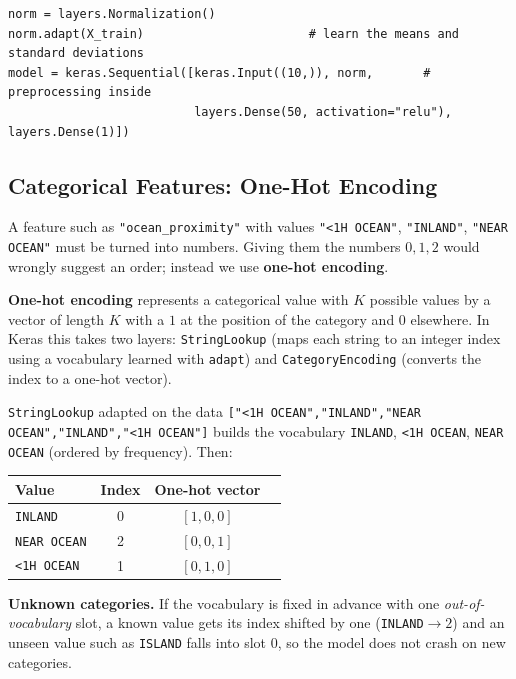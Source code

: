 \begin{lstlisting}
norm = layers.Normalization()
norm.adapt(X_train)                       # learn the means and standard deviations
model = keras.Sequential([keras.Input((10,)), norm,       # preprocessing inside
                          layers.Dense(50, activation="relu"), layers.Dense(1)])
\end{lstlisting}

\subsection{Categorical Features: One-Hot Encoding}

A feature such as \texttt{"ocean\_proximity"} with values \texttt{"<1H OCEAN"}, \texttt{"INLAND"}, \texttt{"NEAR OCEAN"} must be turned into numbers. Giving them the numbers $0,1,2$ would wrongly suggest an order; instead we use \textbf{one-hot encoding}.

\begin{definition}
\textbf{One-hot encoding} represents a categorical value with $K$ possible values by a vector of length $K$ with a $1$ at the position of the category and $0$ elsewhere. In Keras this takes two layers: \texttt{StringLookup} (maps each string to an integer index using a vocabulary learned with \texttt{adapt}) and \texttt{CategoryEncoding} (converts the index to a one-hot vector).
\end{definition}

\begin{example}
\texttt{StringLookup} adapted on the data \texttt{["<1H OCEAN","INLAND","NEAR OCEAN","INLAND","<1H OCEAN"]} builds the vocabulary \texttt{INLAND}, \texttt{<1H OCEAN}, \texttt{NEAR OCEAN} (ordered by frequency). Then:

\begin{center}
\begin{tabular}{@{}lccl@{}}
\toprule
\textbf{Value} & \textbf{Index} & \textbf{One-hot vector} & \\
\midrule
\texttt{INLAND} & 0 & $[1,0,0]$ & \\
\texttt{NEAR OCEAN} & 2 & $[0,0,1]$ & \\
\texttt{<1H OCEAN} & 1 & $[0,1,0]$ & \\
\bottomrule
\end{tabular}
\end{center}

\textbf{Unknown categories.} If the vocabulary is fixed in advance with one \emph{out-of-vocabulary} slot, a known value gets its index shifted by one (\texttt{INLAND}$\to2$) and an unseen value such as \texttt{ISLAND} falls into slot $0$, so the model does not crash on new categories.
\end{example}

